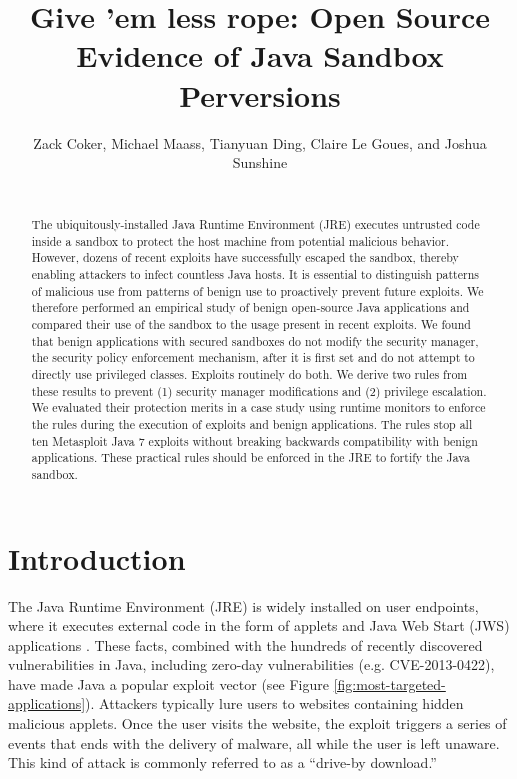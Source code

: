 \documentclass{sig-alternate}
\begin{document}

\title{Give 'em less rope: Open Source Evidence of Java Sandbox Perversions}

\author{\alignauthor Zack Coker, Michael Maass, Tianyuan Ding, Claire Le Goues, and Joshua Sunshine \\
 \\
} 

\maketitle
\thispagestyle{plain} 
\pagestyle{plain}
\begin{abstract}
The ubiquitously-installed Java Runtime Environment (JRE) executes
untrusted code inside a sandbox to protect the host machine from potential
malicious behavior. However, dozens of recent exploits have successfully
escaped the sandbox, thereby enabling attackers to infect countless
Java hosts. It is essential to distinguish patterns of malicious use
from patterns of benign use to proactively prevent future exploits.
We therefore performed an empirical study of benign open-source Java
applications and compared their use of the sandbox to the usage present
in recent exploits. We found that benign applications with secured
sandboxes do not modify the security manager, the security policy
enforcement mechanism, after it is first set and do not attempt to
directly use privileged classes. Exploits routinely do both. We derive two rules from these results to prevent (1) security manager modifications and (2) privilege escalation. We evaluated their protection merits in a case study using runtime monitors to enforce the rules during the execution of exploits and benign applications. The rules stop all ten Metasploit Java 7 exploits without breaking backwards compatibility with benign applications. These practical rules should be enforced in the JRE to fortify the Java sandbox.
\end{abstract}

\section{Introduction}

The Java Runtime Environment (JRE) is widely installed on user endpoints,
where it executes external code in the form of applets and Java Web Start (JWS) applications \cite{gong1997going,gong2003inside}.
These facts, combined with the hundreds of recently discovered vulnerabilities
in Java, including zero-day vulnerabilities (e.g. CVE-2013-0422),
have made Java a popular exploit vector (see Figure \ref{fig:most-targeted-applications}).
Attackers typically lure users to websites containing hidden malicious
applets. Once the user visits the website, the exploit triggers a
series of events that ends with the delivery of malware, all while
the user is left unaware. This kind of attack is commonly referred
to as a ``drive-by download.''
\end{document}
